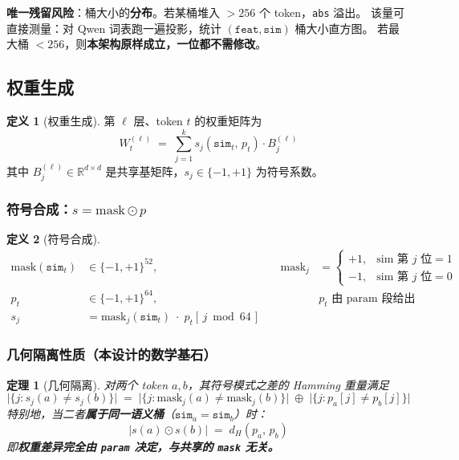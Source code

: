 \documentclass[11pt,a4paper]{ctexart}
\newcommand{\warn}[1]{\textcolor{warnred}{\textbf{#1}}}
\newtheorem{theorem}{定理}
\theoremstyle{definition}
\newtheorem{definition}{定义}
\begin{document}
\warn{唯一残留风险}：桶大小的\textbf{分布}。若某桶堆入 $>256$ 个 token，\texttt{abs} 溢出。
该量可直接测量：对 Qwen 词表跑一遍投影，统计 $(\texttt{feat},\texttt{sim})$ 桶大小直方图。
若最大桶 $<256$，则\textbf{本架构原样成立，一位都不需修改}。

\subsection{权重生成}

\begin{definition}[权重生成]
第 $\ell$ 层、token $t$ 的权重矩阵为
\begin{equation}
W_t^{(\ell)} \;=\; \sum_{j=1}^{k} s_j(\texttt{sim}_t,\, p_t)\cdot B_j^{(\ell)}
\label{eq:Wgen}
\end{equation}
其中 $B_j^{(\ell)}\in\mathbb{R}^{d\times d}$ 是共享基矩阵，$s_j\in\{-1,+1\}$ 为符号系数。
\end{definition}

\subsubsection{符号合成：$s=\text{mask}\odot p$}

\begin{definition}[符号合成]
\begin{align}
\text{mask}(\texttt{sim}_t) &\in \{-1,+1\}^{52}, &\quad
\text{mask}_j &= \begin{cases}+1,&\text{sim 第 } j \text{ 位}=1\\ -1,&\text{sim 第 } j \text{ 位}=0\end{cases}\\
p_t &\in \{-1,+1\}^{64}, &\quad & p_t \text{ 由 param 段给出}\\
s_j &= \text{mask}_j(\texttt{sim}_t)\;\cdot\; p_t[\,j \bmod 64\,]
\end{align}
\end{definition}

\subsubsection{几何隔离性质（本设计的数学基石）}

\begin{theorem}[几何隔离]\label{thm:iso}
对两个 token $a,b$，其符号模式之差的 Hamming 重量满足
\begin{equation}
\bigl|\{j : s_j(a)\ne s_j(b)\}\bigr| \;=\; \bigl|\{j : \text{mask}_j(a)\ne\text{mask}_j(b)\}\bigr| \;\oplus\; \bigl|\{j : p_a[j]\ne p_b[j]\}\bigr|
\end{equation}
特别地，当二者\textbf{属于同一语义桶}（$\texttt{sim}_a=\texttt{sim}_b$）时：
\begin{equation}
|s(a)\odot s(b)| \;=\; d_H(p_a,\,p_b)
\end{equation}
即\textbf{权重差异完全由 \texttt{param} 决定，与共享的 \texttt{mask} 无关。}
\end{theorem}
\end{document}
